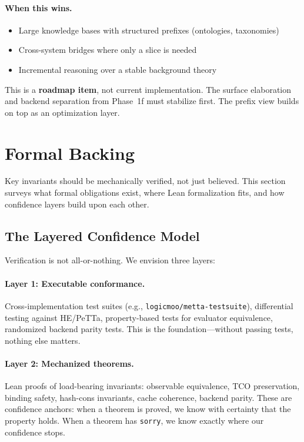 \documentclass[11pt]{article}
\newcommand{\code}[1]{\texttt{#1}}
\newcommand{\PeTTa}{\textup{PeTTa}}
\newcommand{\HE}{\textup{HE}}
\begin{document}
\paragraph{When this wins.}
\begin{itemize}[nosep]
  \item Large knowledge bases with structured prefixes (ontologies, taxonomies)
  \item Cross-system bridges where only a slice is needed
  \item Incremental reasoning over a stable background theory
\end{itemize}

This is a \textbf{roadmap item}, not current implementation.  The surface
elaboration and backend separation from Phase~1f must stabilize first.
The prefix view builds on top as an optimization layer.

\section{Formal Backing}
\label{sec:formal}

Key invariants should be mechanically verified, not just believed.
This section surveys what formal obligations exist, where Lean
formalization fits, and how confidence layers build upon each other.

\subsection{The Layered Confidence Model}

Verification is not all-or-nothing.  We envision three layers:

\paragraph{Layer 1: Executable conformance.}
Cross-implementation test suites (e.g., \code{logicmoo/metta-testsuite}),
differential testing against \HE{}/\PeTTa{}, property-based tests for
evaluator equivalence, randomized backend parity tests.  This is the
foundation---without passing tests, nothing else matters.

\paragraph{Layer 2: Mechanized theorems.}
Lean proofs of load-bearing invariants: observable equivalence, TCO
preservation, binding safety, hash-cons invariants, cache coherence,
backend parity.  These are confidence anchors: when a theorem is proved,
we know with certainty that the property holds.  When a theorem has
\code{sorry}, we know exactly where our confidence stops.
\end{document}
